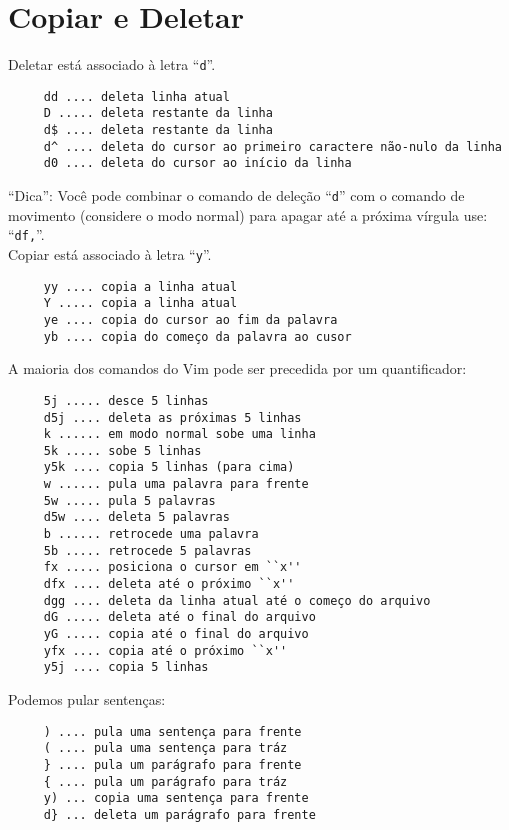 \section{Copiar e Deletar}\label{sec:Copiar e Deletar}

Deletar está associado à letra ``\verb|d|''.

\begin{verbatim}
     dd .... deleta linha atual
     D ..... deleta restante da linha
     d$ .... deleta restante da linha
     d^ .... deleta do cursor ao primeiro caractere não-nulo da linha
     d0 .... deleta do cursor ao início da linha
\end{verbatim}


``Dica'': Você pode combinar o comando de deleção ``\verb+d+'' com o
comando de movimento (considere o modo normal) para apagar até a
próxima vírgula use: ``\verb+df,+''. \\


Copiar está associado à letra ``\verb|y|''.

\begin{verbatim}
     yy .... copia a linha atual
     Y ..... copia a linha atual
     ye .... copia do cursor ao fim da palavra
     yb .... copia do começo da palavra ao cusor
\end{verbatim}

A maioria dos comandos do Vim pode ser precedida por um quantificador:

\begin{verbatim}
     5j ..... desce 5 linhas
     d5j .... deleta as próximas 5 linhas
     k ...... em modo normal sobe uma linha
     5k ..... sobe 5 linhas
     y5k .... copia 5 linhas (para cima)
     w ...... pula uma palavra para frente
     5w ..... pula 5 palavras
     d5w .... deleta 5 palavras
     b ...... retrocede uma palavra
     5b ..... retrocede 5 palavras
     fx ..... posiciona o cursor em ``x''
     dfx .... deleta até o próximo ``x''
     dgg .... deleta da linha atual até o começo do arquivo
     dG ..... deleta até o final do arquivo
     yG ..... copia até o final do arquivo
     yfx .... copia até o próximo ``x''
     y5j .... copia 5 linhas
\end{verbatim}

Podemos pular sentenças:

\begin{verbatim}
     ) .... pula uma sentença para frente
     ( .... pula uma sentença para tráz
     } .... pula um parágrafo para frente
     { .... pula um parágrafo para tráz
     y) ... copia uma sentença para frente
     d} ... deleta um parágrafo para frente
\end{verbatim}

